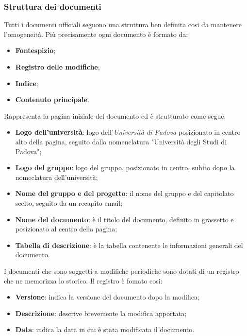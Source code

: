 \subsubsection{Struttura dei documenti}
Tutti i documenti ufficiali seguono una struttura ben definita cosi da mantenere l'omogeneità. Più precisamente ogni documento è formato da:
\begin{itemize}
    \item \textbf{Fontespizio};
    \item \textbf{Registro delle modifiche};
    \item \textbf{Indice};
    \item \textbf{Contenuto principale}.
\end{itemize}

Rappresenta la pagina iniziale del documento ed è strutturato come segue:
\begin{itemize}
    \item \textbf{Logo dell'università}: logo dell'\textit{Università di Padova} posizionato in centro alto della pagina, seguito dalla nomenclatura "Università degli  Studi di Padova";
    \item \textbf{Logo del gruppo}: logo del gruppo, posizionato in centro, subito dopo la nomeclatura dell'università;
    \item \textbf{Nome del gruppo e del progetto}: il nome del gruppo e del capitolato scelto, seguito da un recapito email;
    \item \textbf{Nome del documento}: è il titolo del documento, definito in grassetto e posizionato al centro della pagina;
    \item \textbf{Tabella di descrizione}: è la tabella contenente le informazioni generali del documento.
\end{itemize}

I documenti che sono soggetti a modifiche periodiche sono dotati di un registro che ne memorizza lo storico. Il registro è fomato cosi:
\begin{itemize}
    \item \textbf{Versione}: indica la versione del documento dopo la modifica;
    \item \textbf{Descrizione}: descrive brevemente la modifica apportata;
    \item \textbf{Data}: indica la data in cui è stata modificata il documento.
\end{itemize}

